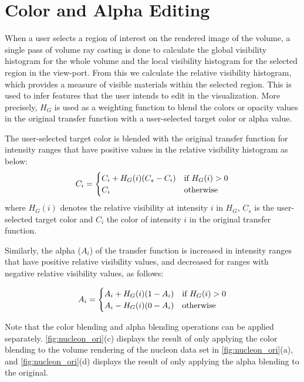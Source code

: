\documentclass[twoside,twocolumn,10pt]{article}
\begin{document}
\section{Color and Alpha Editing} \label{color_and_alpha_editing}

When a user selects a region of interest on the rendered image of the volume, a single pass of volume ray casting is done to calculate the global visibility histogram for the whole volume and the local visibility histogram for the selected region in the view-port. From this we calculate the relative visibility histogram, which provides a measure of visible materials within the selected region. This is used to infer features that the user intends to edit in the visualization. More precisely, $H_G$ is used as a weighting function to blend the colors or opacity values in the original transfer function with a user-selected target color or alpha value.

The user-selected target color is blended with the original transfer function for intensity ranges that have positive values in the relative visibility histogram as below:
\[
C_{i} =
\begin{cases}
C_{i}+H_{G}(i)(C_{s}-C_{i}) & \text{if $ H_{G}(i)>0 $} \\
C_{i} & \text{otherwise}
\end{cases}
\]
where $ H_{G}(i) $ denotes the relative visibility at intensity $ i $ in $ H_{G} $, $ C_{s} $ is the user-selected target color and $ C_{i} $ the color of intensity $ i $ in the original transfer function.

Similarly, the alpha ($A_i$) of the transfer function is increased in intensity ranges that have positive relative visibility values, and decreased for ranges with negative relative visibility values, as follows:




\[
A_{i} =
\begin{cases}
A_{i}+H_{G}(i)(1-A_{i}) & \text{if $ H_{G}(i)>0 $} \\
A_{i}-H_{G}(i)(0-A_{i}) & \text{otherwise}
\end{cases}
\]

Note that the color blending and alpha blending operations can be applied separately. \autoref{fig:nucleon_ori}(c) displays the result of only applying the color blending to the volume rendering of the nucleon data set in \autoref{fig:nucleon_ori}(a), and \autoref{fig:nucleon_ori}(d) displays the result of only applying the alpha blending to the original.
\end{document}
